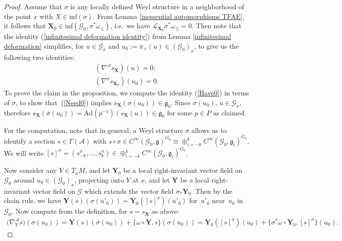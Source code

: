 \documentclass[11pt]{article}
\def\g{\mathfrak{g}}
\def\Abdle{\mathcal{A}}
\def\Gbdle{\mathcal{G}}
\def\Lie{\mathcal{L}}
\def\isom{\cong}
\theoremstyle{plain}
\theoremstyle{definition}
\begin{document}
\begin{proof} Assume that $\sigma$ is any locally def\/ined Weyl structure in a neighborhood of the point $x$ with $X \in \mathrm{inf}(\sigma)$. From Lemma \ref{inessential automorphisms TFAE}, it follows that $\mathbf{X}_0 \in \mathrm{inf}(\Gbdle_0,\sigma^*\omega_{\leq})$, i.e.\ we have $\Lie_{\mathbf{X}_0} \sigma^*\omega_{\leq} = 0$. Then note that the identity (\ref{infinitesimal deformation identity}) from Lemma \ref{infinitesimal deformation} simplif\/ies, for $u \in \Gbdle_x$ and $u_0 := \pi_+(u) \in (\Gbdle_0)_x$, to give us the following two identities:
\begin{gather}
(\nabla^{\Abdle} s_{\mathbf{X}})(u) = 0; \label{Have0} \\
(\nabla^{\sigma} s_{\mathbf{X}_0})(u_0) = 0. \label{Need0}
\end{gather}
 To prove the claim in the proposition, we compute the identity (\ref{Have0}) in terms of $\sigma$, to show that~(\ref{Need0}) implies $s_{\mathbf{X}}(\sigma(u_0)) \in \g_0$. Since $\sigma(u_0)$, $u \in \Gbdle_x$, therefore $s_{\mathbf{X}}(\sigma(u_0)) = \mathrm{Ad}(p^{-1})(s_{\mathbf{X}}(u)) \in \g_0$ for some $p \in P$ as claimed.

 For the computation, note that in general, a Weyl structure $\sigma$ allows us to identify a section $s \in \Gamma(\Abdle)$ with $s \circ \sigma \in C^{\infty}(\Gbdle_0,\g)^{G_0} \isom \oplus_{i=-k}^k C^{\infty}(\Gbdle_0,\g_i)^{G_0}$. We will write $[s]^{\sigma} = (s^{\sigma}_{-k}, \ldots , s^{\sigma}_k) \in \oplus_{i=-k}^k C^{\infty}(\Gbdle_0,\g_i)^{G_0}$.

  Now consider any $Y \in T_xM$, and let $\mathbf{Y}_0$ be a local right-invariant vector f\/ield on $\Gbdle_0$ around $u_0 \in (\Gbdle_0)_x$, projecting onto $Y$ at $x$, and let $\mathbf{Y}$ be a local right-invariant vector f\/ield on $\Gbdle$ which extends the vector f\/ield $\sigma_* \mathbf{Y}_0$. Then by the chain rule, we have $\mathbf{Y}(s)(\sigma(u'_0)) = \mathbf{Y}_0([s]^{\sigma})(u'_0)$ for~$u'_0$ near~$u_0$ in~$\Gbdle_0$. Now compute from the def\/inition, for $s = s_{\mathbf{X}}$ as above:
\begin{gather*}
\big(\nabla^{\Abdle}_Y s\big)(\sigma(u_0))  = \mathbf{Y}(s)(\sigma(u_0)) + \{\omega \circ \mathbf{Y},s\}(\sigma(u_0))
  = \mathbf{Y}_0([s]^{\sigma})(u_0) + \{\sigma^*\omega \circ \mathbf{Y}_0,[s]^{\sigma}\}(u_0).
\end{gather*}


\end{proof}
\end{document}
